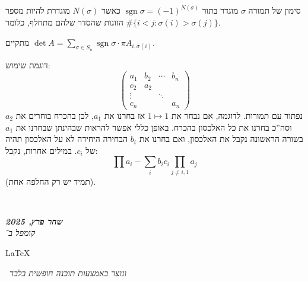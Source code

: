 \documentclass[]{article}
\newcommand\en[1] {\begin{otherlanguage}{english}#1\end{otherlanguage}}
\newcommand\ndoc  {\dotfill \\ \vfil {\begin{center}
			{\textbf{\textit{שחר פרץ, 2025}} \\
				\scriptsize \textit{קומפל ב־}\en{\LaTeX}\,\textit{ ונוצר באמצעות תוכנה חופשית בלבד}}
	\end{center}} \vfil	}
\DeclareMathOperator{\sgn}    {sgn}
\newcommand\co        {\colon}
\newcommand\pms[1]    {\begin{pmatrix}
		#1
\end{pmatrix}}
\newcommand\sg        {\sigma}
\theoremstyle{definition}
\begin{document}
	סימון של תמורה $\sg$ מוגדר בתור $\sgn \sg = (-1)^{N(\sg)}$ כאשר $N(\sg)$ מוגדרת להיות מספר הזוגות שהסדר שלהם מתחלף, כלומר $\#\{i < j \co \sg(i) > \sg(j)\}$. 
	
	מתקיים $\det A = \sum_{\sg \in S_n} \sgn \sg \cdot \pi A_{i, \sg(i)}$. 
	
	דוגמת שימוש: 
	\[ \pms{a_1 & b_2 & \cdots & b_n \\ c_2 & a_2 & \\ \vdots && \ddots  \\ c_n &&& a_n} \]
	נפתור עם תמורות. לדוגמה, אם נבחר את $1 \mapsto 1$ אז בחרנו את $a_1$, לכן בהכרח בוחרים את $a_2$ וסה''כ בחרנו את כל האלכסון בהכרח. באופן כללי אפשר להראות שבהינתן שבחרנו את $a_1$ בשורה הראשונה נקבל את האלכסון, ואם בחרנו את $b_i$ הבחירה היחידה לא על האלכסון תהיה של $c_i$. במילים אחרות, נקבל: 
	\[ \prod a_i - \sum_i b_ic_i \prod_{j \neq i, 1} a_j \]
	(תמיד יש רק החלפה אחת). 
	
	\ndoc
\end{document}
